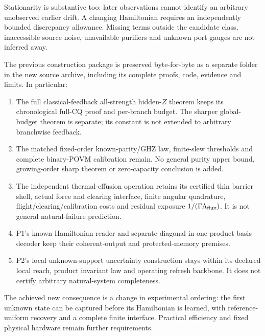 \documentclass[11pt]{article}
\begin{document}
Stationarity is substantive too: later observations cannot identify an
arbitrary unobserved earlier drift. A changing Hamiltonian requires an
independently bounded discrepancy allowance. Missing terms outside the
candidate class, inaccessible source noise, unavailable purifiers and
unknown port gauges are not inferred away.

The previous construction package is preserved byte-for-byte as a
separate folder in the new source archive, including its complete
proofs, code, evidence and limits. In particular:
\begin{enumerate}
\item The full classical-feedback all-strength hidden-\(Z\) theorem keeps its
chronological full-CQ proof and per-branch budget. The sharper global-budget
theorem is separate; its constant is not extended to arbitrary branchwise feedback.
\item The matched fixed-order known-parity/GHZ law, finite-slew thresholds and
complete binary-POVM calibration remain. No general purity upper bound,
growing-order sharp theorem or zero-capacity conclusion is added.
\item The independent thermal-effusion operation retains its certified thin
barrier shell, actual force and clearing interface, finite angular quadrature,
flight/clearing/calibration costs and residual exposure
\(1/(\Gamma\Lambda_{\rm flux})\). It is not general natural-failure prediction.
\item P1's known-Hamiltonian reader and separate diagonal-in-one-product-basis
decoder keep their coherent-output and protected-memory premises.
\item P2's local unknown-support uncertainty construction stays within its
declared local reach, product invariant law and operating refresh backbone.
It does not certify arbitrary natural-system completeness.
\end{enumerate}

The achieved new consequence is a change in experimental ordering:
the first unknown state can be captured before its Hamiltonian is learned,
with reference-uniform recovery and a complete finite interface.
Practical efficiency and fixed physical hardware remain further requirements.
\end{document}
